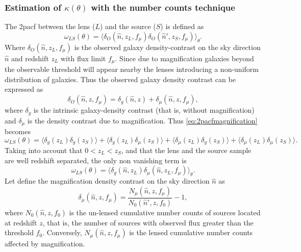 \subsubsection{Estimation of $\kappa(\theta)$ with the number counts technique}
The 2pacf between the lens ($L$) and the source ($S$) is defined as
\begin{equation}
\omega_{LS}(\theta) = \langle\delta_O(\hat n,z_L,f_\mu)\delta_O(\hat n',z_S,f_\mu)\rangle_{\theta}.
\label{eq:2pacfmagnification}
\end{equation}
Where $\delta_O(\hat n,z_L,f_\mu)$ is the observed galaxy density-contrast on the sky direction $\hat n$ and redshift $z_L$ with flux limit $f_\mu$. Since due to magnification galaxies beyond the observable threshold will appear nearby the lenses introducing a non-uniform distribution of galaxies. Thus the observed galaxy density contrast can be expressed as
\begin{equation}
\delta_O(\hat n,z,f_\mu) = \delta_g(\hat n,z)+\delta_\mu(\hat n,z,f_\mu),
\end{equation}
where $\delta_g$ is the intrinsic galaxy-density contrast (that is, without magnification) and $\delta_\mu$ is the density contrast due to magnification. Thus \autoref{eq:2pacfmagnification} becomes
\begin{equation}
\omega_{LS}(\theta) = \langle\delta_g(z_L)\delta_g(z_S)\rangle+\langle\delta_g(z_L)\delta_\mu(z_S)\rangle+\langle\delta_\mu(z_L)\delta_g(z_S)\rangle+\langle\delta_\mu(z_L)\delta_\mu(z_S)\rangle.
\end{equation}
Taking into account that $0<z_L<z_S$, and that the lens and the source sample are well redshift separated, the only non vanishing term is
\begin{equation}
\omega_{LS}(\theta) = \langle\delta_g(\hat n,z_L)\delta_\mu(\hat n,z_L,f_\mu)\rangle_\theta.
\end{equation}
Let define the magnification density contrast on the sky direction $\hat n$ as 
\begin{equation}
\delta_\mu(\hat n,z,f_\mu) = \frac{N_\mu(\hat n,z,f_\mu)}{N_0(\hat n',z,f_0)}-1,
\end{equation}
where $N_0(\hat n,z,f_0)$ is the un-lensed cumulative number counts of sources located at redshift $z$, that is, the number of sources with observed flux greater than the threshold $f_0$. Conversely, $N_\mu(\hat n,z,f_\mu)$ is the lensed cumulative number counts affected by magnification.

